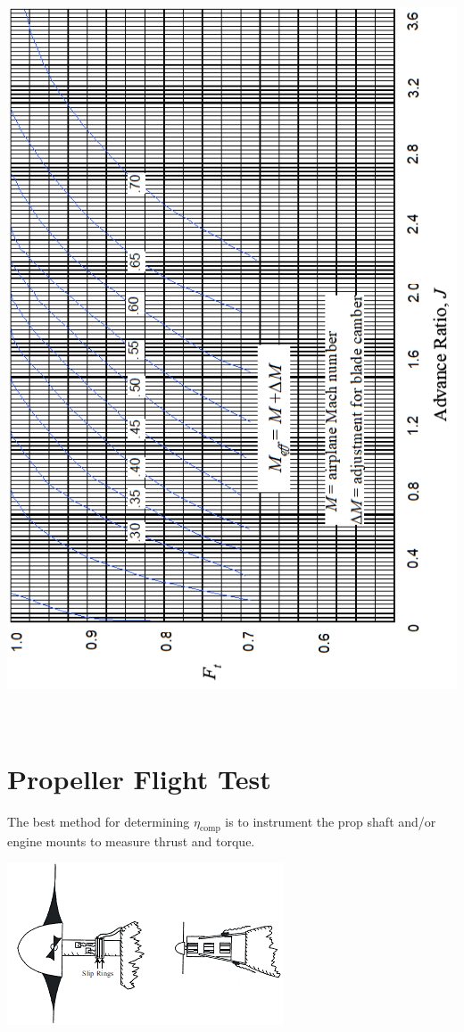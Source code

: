\documentclass[
]{book}
\begin{document}
\includegraphics[width=5.75972in,height=8.72778in]{media/11/image30.png}

\hypertarget{propeller-flight-test}{%
\section{Propeller Flight Test}\label{propeller-flight-test}}

The best method for determining \(\eta_{\text{comp}}\) is to instrument the prop shaft and/or engine mounts to measure thrust and torque.

\includegraphics[width=3.22847in,height=1.88542in]{media/11/image31.png}
\end{document}
